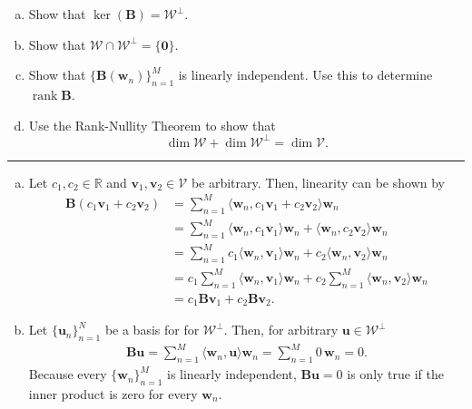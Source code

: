 \documentclass[12pt]{amsart}
\newcommand{\1}{\mathbbm{1}}
\newcounter{Theorem}
\numberwithin{equation}{section}
\numberwithin{Theorem}{section}
\theoremstyle{plain} %
\theoremstyle{definition}
\theoremstyle{remark}
\begin{document}
\begin{enumerate}[1.]
\begin{enumerate}[(a)]
\item Show that \(\operatorname{ker}(\mathbf{B}) = \mathcal{W}^{\bot}\).\medskip

\item Show that \(\mathcal{W}\cap\mathcal{W}^{\bot}=\{\mathbf{0}\}\).\medskip

\item Show that \(\{\mathbf{B}(\mathbf{w}_{n})\}_{n=1}^{M}\) is linearly independent. Use this to determine \(\operatorname{rank}\mathbf{B}\).\medskip

\item Use the Rank-Nullity Theorem to show that
\[\dim\mathcal{W} + \dim\mathcal{W}^{\bot} = \dim\mathcal{V}.\]

\end{enumerate}\bigskip

\hrule
\bigskip
\begin{enumerate}[(a)]
\item 
Let \(c_1,c_2\in\mathbb{R}\) and \(\mathbf{v}_1,\mathbf{v}_2\in\mathcal{V}\) be arbitrary. Then, linearity can be shown by
\begin{align*}
	\mathbf{B}(c_1\mathbf{v}_1+c_2\mathbf{v}_2)
	&= \sum_{n=1}^{M} \langle \mathbf{w}_n, c_1\mathbf{v}_1+c_2\mathbf{v}_2 \rangle\mathbf{w}_n \\
	&= \sum_{n=1}^{M} \langle \mathbf{w}_n, c_1\mathbf{v}_1 \rangle\mathbf{w}_n + \langle \mathbf{w}_n,c_2\mathbf{v}_2 \rangle\mathbf{w}_n \\
	&= \sum_{n=1}^{M} c_1\langle \mathbf{w}_n,\mathbf{v}_1 \rangle\mathbf{w}_n + c_2\langle \mathbf{w}_n,\mathbf{v}_2 \rangle\mathbf{w}_n \\
	&=  c_1\sum_{n=1}^{M}\langle \mathbf{w}_n,\mathbf{v}_1 \rangle\mathbf{w}_n + c_2\sum_{n=1}^{M}\langle \mathbf{w}_n,\mathbf{v}_2 \rangle\mathbf{w}_n \\
	&= c_1\mathbf{B}\mathbf{v}_1 + c_2\mathbf{B}\mathbf{v}_2 .
\end{align*}

\item 
Let \(\{\mathbf{u}_n\}_{n=1}^N\) be a basis for for \(\mathcal{W}^\perp\). Then, for arbitrary \(\mathbf{u}\in\mathcal{W}^\perp\)
\begin{align*}
	\mathbf{B}\mathbf{u}
	= \sum_{n=1}^{M} \langle \mathbf{w}_n,\mathbf{u} \rangle\mathbf{w}_n
	= \sum_{n=1}^{M} 0 \, \mathbf{w}_n
	= 0 .
\end{align*}
Because every \(\{\mathbf{w}_{n}\}_{n=1}^{M}\) is linearly independent, \(\mathbf{B}\mathbf{u}=0\) is only true if the inner product is zero for every
\(\mathbf{w}_{n}\). 


\end{enumerate}
\end{enumerate}
\end{document}
